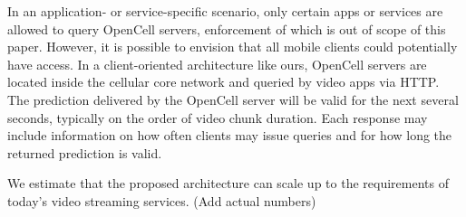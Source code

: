 In an application- or service-specific scenario, only certain apps or services are allowed to query OpenCell servers, enforcement of which is out of scope of this paper. However, it is possible to envision that all mobile clients could potentially have access. In a client-oriented architecture like ours, OpenCell servers are located inside the cellular core network and queried by video apps via HTTP. The prediction delivered by the OpenCell server will be valid for the next several seconds, typically on the order of video chunk duration. Each response may include information on how often clients may issue queries and for how long the returned prediction is valid.

We estimate that the proposed architecture can scale up to the requirements of today's video streaming services. 
(Add actual numbers)











